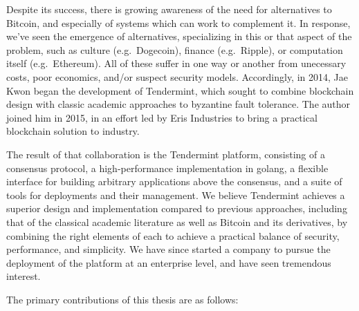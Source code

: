 Despite its success, there is growing awareness of the need for alternatives to Bitcoin, and especially of systems which can work to complement it.
In response, we've seen the emergence of alternatives, specializing in this or that aspect of the problem, such as culture (e.g.~Dogecoin), finance (e.g.~Ripple), 
or computation itself (e.g.~Ethereum).
All of these suffer in one way or another from unecessary costs, poor economics, and/or suspect security models.
Accordingly, in 2014, Jae Kwon began the development of Tendermint, which sought to combine blockchain design with classic academic approaches to byzantine fault tolerance.
The author joined him in 2015, in an effort led by Eris Industries to bring a practical blockchain solution to industry.

The result of that collaboration is the Tendermint platform, consisting of a consensus protocol, a high-performance implementation in golang, 
a flexible interface for building arbitrary applications above the consensus, and a suite of tools for deployments and their management.
We believe Tendermint achieves a superior design and implementation compared to previous approaches, 
including that of the classical academic literature as well as Bitcoin and its derivatives,
by combining the right elements of each to achieve a practical balance of security, performance, and simplicity.
We have since started a company to pursue the deployment of the platform at an enterprise level, and have seen tremendous interest.

The primary contributions of this thesis are as follows:


